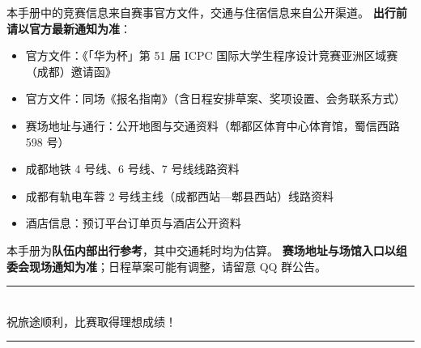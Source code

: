 \documentclass[11pt,a4paper,fontset=windows]{ctexart}
\begin{document}
本手册中的竞赛信息来自赛事官方文件，交通与住宿信息来自公开渠道。
\textbf{出行前请以官方最新通知为准}：

\begin{itemize}[leftmargin=1.6em,itemsep=0.25em]
  \item 官方文件：《「华为杯」第 51 届 ICPC 国际大学生程序设计竞赛亚洲区域赛（成都）邀请函》
  \item 官方文件：同场《报名指南》（含日程安排草案、奖项设置、会务联系方式）
  \item 赛场地址与通行：公开地图与交通资料（郫都区体育中心体育馆，蜀信西路 598 号）
  \item 成都地铁 4 号线、6 号线、7 号线线路资料
  \item 成都有轨电车蓉 2 号线主线（成都西站—郫县西站）线路资料
  \item 酒店信息：预订平台订单页与酒店公开资料
\end{itemize}

\begin{warnbox}
本手册为\textbf{队伍内部出行参考}，其中交通耗时均为估算。
\textbf{赛场地址与场馆入口以组委会现场通知为准}；日程草案可能有调整，请留意 QQ 群公告。
\end{warnbox}

\vfill
\begin{center}
{\color{mainlite}\rule{0.6\textwidth}{0.8pt}}\\[0.6em]
{\small\color{graytx} 祝旅途顺利，比赛取得理想成绩！}\\[0.4em]
{\color{mainlite}\rule{0.6\textwidth}{0.8pt}}
\end{center}
\end{document}

